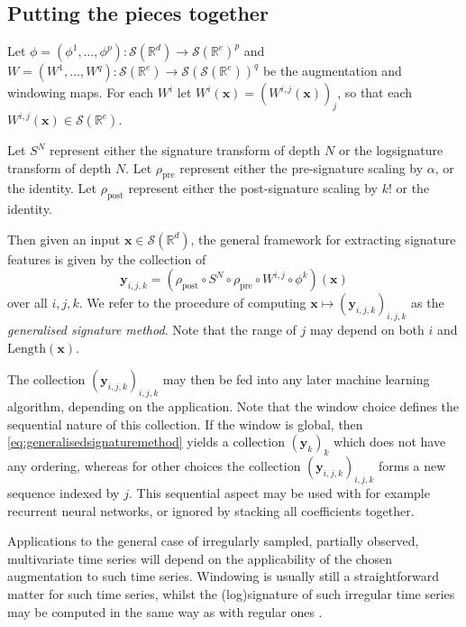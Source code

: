 \documentclass{article}
\theoremstyle{definition}
\theoremstyle{remark}
\newcommand{\reals}{\mathbb{R}}
\newcommand{\tseries}[1]{\mathcal{S}(#1)}
\newcommand{\len}[1]{\mathrm{Length}(#1)}
\begin{document}
	\subsection{Putting the pieces together}
	Let $\phi = (\phi^1, \ldots, \phi^p) \colon \tseries{\reals^d} \to \tseries{\reals^e}^p$ and $W = (W^1, \ldots, W^q) \colon \tseries{\reals^e} \to \tseries{\tseries{\reals^e}}^q$ be the augmentation and windowing maps. For each $W^i$ let $W^i(\mathbf{x}) = (W^{i, j}(\mathbf{x}))_j$, so that each $W^{i, j}(\mathbf{x}) \in \tseries{\reals^e}$.
	
	Let $S^N$ represent either the signature transform of depth $N$ or the logsignature transform of depth $N$. Let $\rho_{\mathrm{pre}}$ represent either the pre-signature scaling by $\alpha$, or the identity. Let $\rho_{\mathrm{post}}$ represent either the post-signature scaling by $k!$ or the identity.
	
	Then given an input $\mathbf{x} \in \tseries{\reals^d}$, the general framework for extracting signature features is given by the collection of
	\begin{equation}\label{eq:generalisedsignaturemethod}
	\mathbf{y}_{i, j, k} = (\rho_{\mathrm{post}} \circ S^N \circ \rho_{\mathrm{pre}} \circ W^{i, j} \circ \phi^k)(\mathbf{x})
	\end{equation}
	over all $i, j, k$. We refer to the procedure of computing $\mathbf{x} \mapsto (\mathbf{y}_{i, j, k})_{i, j, k}$ as the \emph{generalised signature method}. Note that the range of $j$ may depend on both $i$ and $\len{\mathbf{x}}$.

	The collection $(\mathbf{y}_{i, j, k})_{i, j, k}$ may then be fed into any later machine learning algorithm, depending on the application. Note that the window choice defines the sequential nature of this collection. If the window is global, then \eqref{eq:generalisedsignaturemethod} yields a collection $(\mathbf{y}_{k})_k$ which does not have any ordering, whereas for other choices the collection $(\mathbf{y}_{i, j, k})_{i, j, k}$ forms a new sequence indexed by $j$. This sequential aspect may be used with for example recurrent neural networks, or ignored by stacking all coefficients together.
	
	Applications to the general case of irregularly sampled, partially observed, multivariate time series will depend on the applicability of the chosen augmentation to such time series. Windowing is usually still a straightforward matter for such time series, whilst the (log)signature of such irregular time series may be computed in the same way as with regular ones \citep{signatory}.
	
\end{document}
